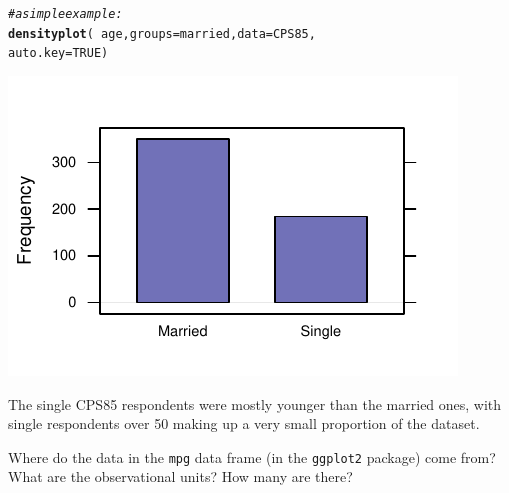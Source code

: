 \documentclass[twoside]{book}\usepackage[]{graphicx}\usepackage[]{xcolor}
\makeatletter
\def\maxwidth{ %
  \ifdim\Gin@nat@width>\linewidth
    \linewidth
  \else
    \Gin@nat@width
  \fi
}
\newcommand{\hlnum}[1]{\textcolor[rgb]{0.686,0.059,0.569}{#1}}%
\newcommand{\hlcom}[1]{\textcolor[rgb]{0.678,0.584,0.686}{\textit{#1}}}%
\newcommand{\hlopt}[1]{\textcolor[rgb]{0,0,0}{#1}}%
\newcommand{\hlstd}[1]{\textcolor[rgb]{0.345,0.345,0.345}{#1}}%
\newcommand{\hlkwc}[1]{\textcolor[rgb]{0.333,0.667,0.333}{#1}}%
\newcommand{\hlkwd}[1]{\textcolor[rgb]{0.737,0.353,0.396}{\textbf{#1}}}%
\newenvironment{kframe}{%
 \def\at@end@of@kframe{}%
 \ifinner\ifhmode%
  \def\at@end@of@kframe{\end{minipage}}%
  \begin{minipage}{\columnwidth}%
 \fi\fi%
 \def\FrameCommand##1{\hskip\@totalleftmargin \hskip-\fboxsep
 \colorbox{shadecolor}{##1}\hskip-\fboxsep
     \hskip-\linewidth \hskip-\@totalleftmargin \hskip\columnwidth}%
 \MakeFramed {\advance\hsize-\width
   \@totalleftmargin\z@ \linewidth\hsize
   \@setminipage}}%
 {\par\unskip\endMakeFramed%
 \at@end@of@kframe}
\newenvironment{knitrout}{}{} %
\newcommand{\Rindex}[1]{\index{\texttt{#1}}}
\newcommand{\dataframe}[1]{{\color{blue!80!black}\texttt{#1}}\Rindex{#1}}
\newcommand{\pkg}[1]{{\color{red!80!black}\texttt{#1}}\Rindex{#1}}
\newcounter{example}[section]
\makeatother
\begin{document}
\begin{solution}
\begin{knitrout}
\color{fgcolor}\begin{kframe}
\begin{alltt}
\hlcom{#a simple example:}
\hlkwd{densityplot}\hlstd{(}\hlopt{~} \hlstd{age ,} \hlkwc{groups}\hlstd{=married ,} \hlkwc{data}\hlstd{=CPS85,}
            \hlkwc{auto.key}\hlstd{=}\hlnum{TRUE}\hlstd{)}
\end{alltt}
\end{kframe}

{\centering \includegraphics[width=\maxwidth]{figures/fig-unnamed-chunk-23-1} 

}



\end{knitrout}
The single CPS85 respondents were mostly younger than the married ones, with single respondents over 50 making up a very small proportion of the dataset. 
\end{solution}

\begin{problem}
	Where do the data in the \dataframe{mpg} data frame (in the 
	\pkg{ggplot2} package) come from?  What are the observational 
	units?  How many are there?
\end{problem}
\end{document}
